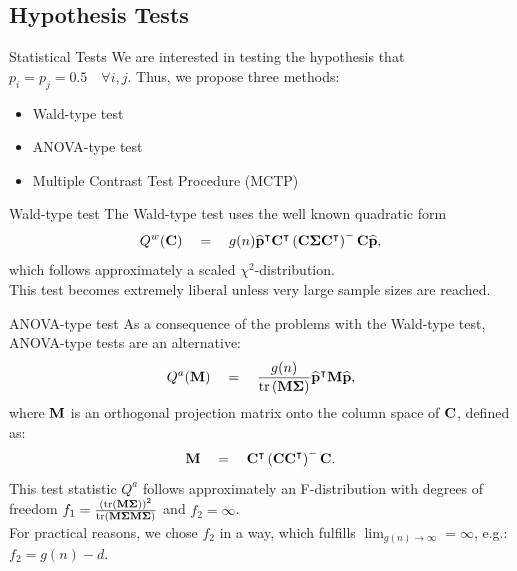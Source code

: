\documentclass[xcolor=dvipsnames, aspectratio = 169]{beamer}
\begin{document}
\subsection*{Hypothesis Tests}
\begin{frame}{Statistical Tests}
	We are interested in testing the hypothesis that $p_i = p_j = 0.5 \quad \forall i, j$. Thus, we propose three methods:
	\begin{itemize}
		\item Wald-type test
		\item ANOVA-type test
		\item Multiple Contrast Test Procedure (MCTP)
	\end{itemize}
\end{frame}

\begin{frame}{Wald-type test}
	The Wald-type test uses the well known quadratic form
	\begin{equation*}
		Q^w(\mathbf{C}) \quad = \quad g(n)\widehat{\mathbf{p}}^{\intercal}\mathbf{C}^{\intercal}\left(\mathbf{C}\bm{\Sigma}\mathbf{C}^{\intercal}\right)^{-}\mathbf{C}\widehat{\mathbf{p}},
	\end{equation*}
	which follows approximately a scaled $\chi^2$-distribution.\\
	This test becomes extremely liberal unless very large sample sizes are reached.
\end{frame}

\begin{frame}{ANOVA-type test}
As a consequence of the problems with the Wald-type test, ANOVA-type tests are an alternative:
\begin{equation*}
	Q^a(\mathbf{M}) \quad = \quad \frac{g(n)}{\mathrm{tr}\left( \mathbf{M}\bm{\Sigma} \right)}\widehat{\mathbf{p}}^{\intercal}\mathbf{M}\widehat{\mathbf{p}},
\end{equation*}
where $\mathbf{M}$ is an orthogonal projection matrix onto the column space of $\mathbf{C}$, defined as:
\begin{equation*}
	\mathbf{M} \quad = \quad \mathbf{C}^{\intercal}\left(\mathbf{CC}^{\intercal}\right)^{-}\mathbf{C}.
\end{equation*}
This test statistic $Q^a$ follows approximately an F-distribution with degrees of freedom $f_1 = \frac{\left(\mathrm{tr}\left( \mathbf{M}\bm{\Sigma} \right)\right)^2}{\mathrm{tr}\left( \mathbf{M}\bm{\Sigma}\mathbf{M}\bm{\Sigma} \right)}$ and $f_2 = \infty$. \\
For practical reasons, we chose $f_2$ in a way, which fulfills $\lim_{g(n) \to \infty} = \infty$, e.g.: $f_2 = g(n) - d$.
\end{frame}
\end{document}
